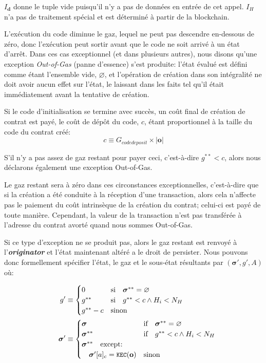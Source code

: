 \documentclass[9pt,oneside]{amsart}
\newcommand{\firsthomesteadblock}{\ensuremath{N_H}}
\begin{document}
\begin{multicols}{2}
$I_\mathbf{d}$ donne le tuple vide puisqu'il n'y a pas de données en entrée de cet appel. $I_H$ n'a pas de traitement spécial et est déterminé à partir de la blockchain.

L'exécution du code diminue le gaz, lequel ne peut pas descendre en-dessous de zéro, donc l'exécution peut sortir avant que le code ne soit arrivé à un état d'arrêt. Dans ces cas exceptionnel (et dans plusieurs autres), nous disons qu'une exception \textit{Out-of-Gas} (panne d'essence) s'est produite: l'état évalué est défini comme étant l'ensemble vide, $\varnothing$, et l'opération de création dans son intégralité ne doit avoir aucun effet sur l'état, le laissant dans les faits tel qu'il était immédiatement avant la tentative de création.

Si le code d'initialisation se termine avec succès, un coût final de création de contrat est payé, le coût de dépôt du code, $c$, étant proportionnel à la taille du code du contrat créé:
\begin{equation}
c \equiv G_{codedeposit} \times |\mathbf{o}|
\end{equation}

S'il n'y a pas assez de gaz restant pour payer ceci, c'est-à-dire $g^{**} < c$, alors nous déclarons également une exception Out-of-Gas.

Le gaz restant sera à zéro dans ces circonstances exceptionnelles, c'est-à-dire que si la création a été conduite à la réception d'une transaction, alors cela n'affecte pas le paiement du coût intrinsèque de la création du contrat; celui-ci est payé de toute manière. Cependant, la valeur de la transaction n'est pas transférée à l'adresse du contrat avorté quand nous sommes Out-of-Gas.

Si ce type d'exception ne se produit pas, alors le gaz restant est renvoyé à l'\textbf{\textit{originator}} et l'état maintenant altéré a le droit de persister. Nous pouvons donc formellement spécifier l'état, le gaz et le sous-état résultants par $(\boldsymbol{\sigma}', g', A)$ où:

\begin{align}
\quad g' &\equiv \begin{cases}
0 & \text{si} \quad \boldsymbol{\sigma}^{**} = \varnothing \\
g^{**} & \text{si} \quad g^{**}<c \wedge H_i<\firsthomesteadblock \\
g^{**} - c & \text{sinon} \\
\end{cases} \\
\quad \boldsymbol{\sigma}' &\equiv  \begin{cases}
\boldsymbol{\sigma} & \text{if} \quad \boldsymbol{\sigma}^{**} = \varnothing \\
\boldsymbol{\sigma}^{**} & \text{if} \quad g^{**}<c \wedge H_i<\firsthomesteadblock \\
\boldsymbol{\sigma}^{**} \quad \text{except:} & \\
\quad\boldsymbol{\sigma}'[a]_c = \texttt{\small KEC}(\mathbf{o}) & \text{sinon}
\end{cases}
\end{align}


\end{multicols}
\end{document}
